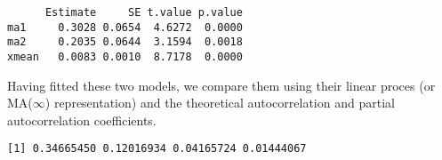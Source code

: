 \documentclass[]{book}
\newenvironment{Shaded}{\begin{snugshade}}{\end{snugshade}}
\newcommand{\KeywordTok}[1]{\textcolor[rgb]{0.13,0.29,0.53}{\textbf{#1}}}
\newcommand{\DataTypeTok}[1]{\textcolor[rgb]{0.13,0.29,0.53}{#1}}
\newcommand{\DecValTok}[1]{\textcolor[rgb]{0.00,0.00,0.81}{#1}}
\newcommand{\CommentTok}[1]{\textcolor[rgb]{0.56,0.35,0.01}{\textit{#1}}}
\newcommand{\OperatorTok}[1]{\textcolor[rgb]{0.81,0.36,0.00}{\textbf{#1}}}
\newcommand{\NormalTok}[1]{#1}
\begin{document}
\begin{verbatim}
      Estimate     SE t.value p.value
ma1     0.3028 0.0654  4.6272  0.0000
ma2     0.2035 0.0644  3.1594  0.0018
xmean   0.0083 0.0010  8.7178  0.0000
\end{verbatim}

Having fitted these two models, we compare them using their linear
proces (or MA(\(\infty\)) representation) and the theoretical
autocorrelation and partial autocorrelation coefficients.

\begin{Shaded}
\end{Shaded}

\begin{verbatim}
[1] 0.34665450 0.12016934 0.04165724 0.01444067
\end{verbatim}
\end{document}
